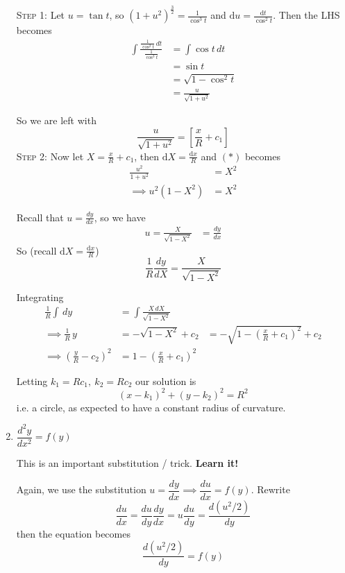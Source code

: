 \documentclass[10pt]{scrartcl}
\begin{document}
\begin{enumerate}[(1)]
\begin{example}[Geometry]
\textsc{Step 1:} Let $u = \tan t$, so $(1 + u^2)^{\frac{3}{2}} = \frac{1}{\cos^3t}$ and $\mathrm{d}u = \frac{\mathrm{d}t}{\cos^2t}$. Then the LHS becomes
\[
\begin{aligned}
  \int \frac{\frac{1}{\cos^2t}\,dt}{\frac{1}{\cos^3t}} &= \int \cos t\,dt\\
  &= \sin t\\
  &= \sqrt{1-\cos^2t}\\
  &= \frac{u}{\sqrt{1+u^2}}
\end{aligned}
\]

So we are left with
\[\frac{u}{\sqrt{1+u^2}} = \left[\frac{x}{R}+c_1\right] \tag{$*$}\]
\textsc{Step 2:} Now let $X = \frac{x}{R} + c_1$, then $\mathrm{d}X = \frac{\mathrm{d}x}{R}$ and $(*)$ becomes
\setlength{\jot}{8pt}
\[
\begin{aligned}
  \frac{u^2}{1+u^2} &= X^2\\
\implies   u^2(1-X^2) &= X^2\end{aligned}
\]

Recall that $u = \frac{dy}{dx}$, so we have
\setlength{\jot}{8pt}
\[
\begin{aligned}
  u = \frac{X}{\sqrt{1-X^2}} &= \frac{dy}{dx}
\end{aligned}
  \]
So (recall $\mathrm{d}X = \frac{\mathrm{d}x}{R}$) 
\[
    \frac{1}{R}\frac{dy}{dX} = \frac{X}{\sqrt{1-X^2}}
\]

Integrating
  \[\begin{aligned}  
  \frac{1}{R}\int\,dy &= \int \frac{X\,dX}{\sqrt{1-X^2}}\\
  \implies   \frac{1}{R}\, y &= -\sqrt{1-X^2} + c_2 &= -\sqrt{1-(\frac{x}{R} + c_1)^2} + c_2\\
\implies   \left(\frac{y}{R}-c_2\right)^2 &= 1-\left(\frac{x}{R} + c_1\right)^2
\end{aligned}
\]

Letting $k_1 = Rc_1,~ k_2 = Rc_2$ our solution is
\[(x-k_1)^2 + (y-k_2)^2 = R^2\]
i.e. a circle, as expected to have a constant radius of curvature.	
\end{example}\vsp

\item $\dfrac{d^2y}{dx^2} = f(y)$\\ %

\begin{note}This is an important substitution / trick. \textbf{Learn it!}\end{note}

Again, we use the substitution $u = \dfrac{dy}{dx}\implies \dfrac{du}{dx} = f(y)$. Rewrite \[\dfrac{du}{dx} = \dfrac{du}{dy}\dfrac{dy}{dx}
  = u\dfrac{du}{dy}
  =\dfrac{d(u^2/2)}{dy}\]then the equation becomes \[\dfrac{d(u^2/2)}{dy} = f(y)\]


\end{enumerate}
\end{document}
